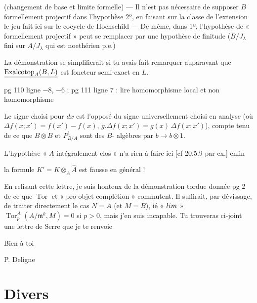 \documentclass[11pt,a4paper]{article}
\begin{document}
(changement de base et limite formelle) — Il n'est pas nécessaire de supposer
$B$ formellement projectif dans l'hypothèse 2º, en faisant sur la classe de
l'extension le jeu fait ici sur le cocycle de Hochschild — De même, dans 1º,
l'hypothèse de « formellement projectif » peut se remplacer par une hypothèse
de finitude ($B/J_\lambda$ fini sur $A/J_\lambda$ qui est noethérien p.e.)

La démonstration se simplifierait si tu avais fait remarquer auparavant que
$\uncertain{\operatorname{Exalcotop}_A(B, L)}$ est foncteur semi-exact en $L$.

pg 110 ligne $-8$, $-6$ ; pg 111 ligne 7 : lire homomorphisme local et non
homomorphisme

Le signe choisi pour $dx$ est l'opposé du signe universellement choisi en
analyse (où $\Delta f(x ; x') = f(x') - f(x)$,
$g.\Delta f(x ; x') = g(x)\, \Delta f(x ; x')$), compte tenu de ce que
$B \otimes B$ et $P^1_{B/A}$ sont des $B$- algèbres par
$b \to b \otimes 1$.


L'hypothèse « $A$ intégralement clos » n'a rien à faire ici [cf 20.5.9 par ex.]
enfin

la formule $K' = K \otimes_A \widehat{A}$ est fausse en général !

En relisant cette lettre, je suis honteux de la démonstration tordue donnée pg
2 de ce que $\operatorname{Tor}$ et « pro-objet complétion » commutent. Il
suffirait, par dévissage, de traiter directement le cas $N = A$ (et $M = B$),
ié « $\varprojlim$ » $\operatorname{Tor}^A_p(A/\mathfrak{m}^k, M) = 0$ si
$p > 0$, mais j'en suis incapable. Tu trouveras ci-joint une lettre de Serre
que je te renvoie

Bien à toi

P. Deligne

\section{Divers}
\end{document}
